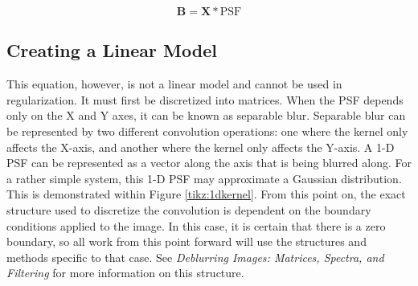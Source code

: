 \documentclass[letterpaper, 11pt, titlepage, twocolumn]{article}
\begin{document}
\begin{equation}
    \label{eqn:conv}
    \mathbf{B}=\mathbf{X} \ast \textrm{PSF}
\end{equation}

\subsection{Creating a Linear Model}
This equation, however, is not a linear model and cannot be used in regularization. It must first be discretized into matrices. When the PSF depends only on the X and Y axes, it can be known as separable blur. Separable blur can be represented by two different convolution operations: one where the kernel only affects the X-axis, and another where the kernel only affects the Y-axis. A 1-D PSF can be represented as a vector along the axis that is being blurred along. For a rather simple system, this 1-D PSF may approximate a Gaussian distribution. This is demonstrated within Figure \ref{tikz:1dkernel}. From this point on, the exact structure used to discretize the convolution is dependent on the boundary conditions applied to the image. In this case, it is certain that there is a zero boundary, so all work from this point forward will use the structures and methods specific to that case. See \emph{Deblurring Images: Matrices, Spectra, and Filtering} \cite{hansen_deblurring_2006} for more information on this structure.
\end{document}
